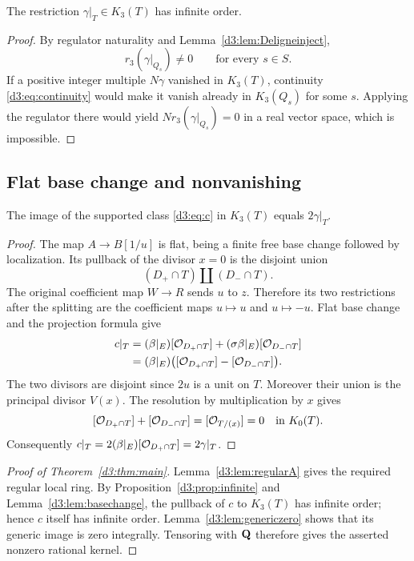 \begin{proposition}\label{d3:prop:infinite}
The restriction $\gamma|_T\in K_3(T)$ has infinite order.
\end{proposition}
\begin{proof}
By regulator naturality and Lemma~\ref{d3:lem:Deligneinject},
\[
r_3(\gamma|_{Q_s})\neq 0
\qquad\text{for every }s\in S.
\]
If a positive integer multiple $N\gamma$ vanished in $K_3(T)$, continuity \eqref{d3:eq:continuity} would make it vanish already in $K_3(Q_s)$ for some $s$. Applying the regulator there would yield $N r_3(\gamma|_{Q_s})=0$ in a real vector space, which is impossible.
\end{proof}

\subsection{Flat base change and nonvanishing}

\begin{lemma}\label{d3:lem:basechange}
The image of the supported class \eqref{d3:eq:c} in $K_3(T)$ equals $2\gamma|_T$.
\end{lemma}
\begin{proof}
The map $A\to B[1/u]$ is flat, being a finite free base change followed by localization. Its pullback of the divisor $x=0$ is the disjoint union
\[
(D_+\cap T)\amalg(D_-\cap T).
\]
The original coefficient map $W\to R$ sends $u$ to $z$. Therefore its two restrictions after the splitting are the coefficient maps $u\mapsto u$ and $u\mapsto -u$. Flat base change and the projection formula give
\begin{align*}
c|_T
&=(\beta|_E)[\mathcal O_{D_+\cap T}]+(\sigma\beta|_E)[\mathcal O_{D_-\cap T}]\\
&=(\beta|_E)\bigl([\mathcal O_{D_+\cap T}]-[\mathcal O_{D_-\cap T}]\bigr).
\end{align*}
The two divisors are disjoint since $2u$ is a unit on $T$. Moreover their union is the principal divisor $V(x)$. The resolution by multiplication by $x$ gives
\[
[\mathcal O_{D_+\cap T}]+[\mathcal O_{D_-\cap T}]
=[\mathcal O_{T/(x)}]=0\quad\text{in }K_0(T).
\]
Consequently $c|_T=2(\beta|_E)[\mathcal O_{D_+\cap T}]=2\gamma|_T$.
\end{proof}

\begin{proof}[Proof of Theorem~\ref{d3:thm:main}]
Lemma~\ref{d3:lem:regularA} gives the required regular local ring. By Proposition~\ref{d3:prop:infinite} and Lemma~\ref{d3:lem:basechange}, the pullback of $c$ to $K_3(T)$ has infinite order; hence $c$ itself has infinite order. Lemma~\ref{d3:lem:genericzero} shows that its generic image is zero integrally. Tensoring with $\mathbf Q$ therefore gives the asserted nonzero rational kernel.
\end{proof}

